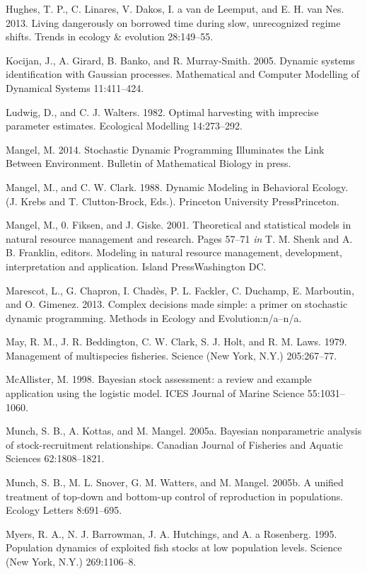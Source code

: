 \documentclass[author-year, 12pt,review]{components/elsarticle} %
\begin{document}
Hughes, T. P., C. Linares, V. Dakos, I. a van de Leemput, and E. H. van
Nes. 2013. Living dangerously on borrowed time during slow, unrecognized
regime shifts. Trends in ecology \& evolution 28:149--55.

Kocijan, J., A. Girard, B. Banko, and R. Murray-Smith. 2005. Dynamic
systems identification with Gaussian processes. Mathematical and
Computer Modelling of Dynamical Systems 11:411--424.

Ludwig, D., and C. J. Walters. 1982. Optimal harvesting with imprecise
parameter estimates. Ecological Modelling 14:273--292.

Mangel, M. 2014. Stochastic Dynamic Programming Illuminates the Link
Between Environment. Bulletin of Mathematical Biology in press.

Mangel, M., and C. W. Clark. 1988. Dynamic Modeling in Behavioral
Ecology. (J. Krebs and T. Clutton-Brock, Eds.). Princeton University
PressPrinceton.

Mangel, M., 0. Fiksen, and J. Giske. 2001. Theoretical and statistical
models in natural resource management and research. Pages 57--71
\emph{in} T. M. Shenk and A. B. Franklin, editors. Modeling in natural
resource management, development, interpretation and application. Island
PressWashington DC.

Marescot, L., G. Chapron, I. Chadès, P. L. Fackler, C. Duchamp, E.
Marboutin, and O. Gimenez. 2013. Complex decisions made simple: a primer
on stochastic dynamic programming. Methods in Ecology and
Evolution:n/a--n/a.

May, R. M., J. R. Beddington, C. W. Clark, S. J. Holt, and R. M. Laws.
1979. Management of multispecies fisheries. Science (New York, N.Y.)
205:267--77.

McAllister, M. 1998. Bayesian stock assessment: a review and example
application using the logistic model. ICES Journal of Marine Science
55:1031--1060.

Munch, S. B., A. Kottas, and M. Mangel. 2005a. Bayesian nonparametric
analysis of stock-recruitment relationships. Canadian Journal of
Fisheries and Aquatic Sciences 62:1808--1821.

Munch, S. B., M. L. Snover, G. M. Watters, and M. Mangel. 2005b. A
unified treatment of top-down and bottom-up control of reproduction in
populations. Ecology Letters 8:691--695.

Myers, R. A., N. J. Barrowman, J. A. Hutchings, and A. a Rosenberg.
1995. Population dynamics of exploited fish stocks at low population
levels. Science (New York, N.Y.) 269:1106--8.
\end{document}
